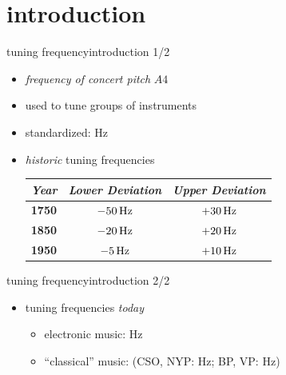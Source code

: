     \section[intro]{introduction}
        \begin{frame}{tuning frequency}{introduction 1/2}
            \begin{itemize}
                \item	\textit{frequency of concert pitch} $A4$
                \item	used to tune groups of instruments
                \item	standardized: \unit[440]{Hz}
            \end{itemize}
            \pause
            \vspace{3mm}
            \begin{itemize}
                \item	\textit{historic} tuning frequencies
                        \begin{footnotesize}\begin{table}
                            \vspace{-3mm}
                            \begin{tabular}{lcc} %
                                \\ \hline
                                \bf{\emph{Year}}	 & \bf{\emph{Lower Deviation}}	 & \bf{\emph{Upper Deviation}}\\ 
                                 \hline
                                \bf{1750}	 & $-\unit[50]{Hz}$	 & $+\unit[30]{Hz}$\\
                                \bf{1850}	 & $-\unit[20]{Hz}$	 & $+\unit[20]{Hz}$\\
                                \bf{1950}	 & $-\unit[5]{Hz}$	 & $+\unit[10]{Hz}$\\
                            \end{tabular}
                        \end{table}\end{footnotesize}
            \end{itemize}
        \end{frame}
        
        \begin{frame}{tuning frequency}{introduction 2/2}
            \begin{itemize}
                \item	tuning frequencies \textit{today}
                        \begin{itemize}
                            \item	electronic music: \unit[440]{Hz}
                            \item	``classical'' music: (CSO, NYP: \unit[442]{Hz}; BP, VP: \unit[443]{Hz})
                        \end{itemize}
            \end{itemize}
        \end{frame}
        
